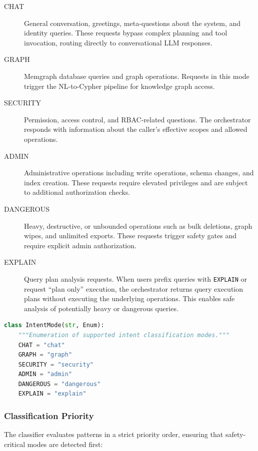 \begin{description}
    \item[CHAT] General conversation, greetings, meta-questions about the system, and identity queries. These requests bypass complex planning and tool invocation, routing directly to conversational LLM responses.
    
    \item[GRAPH] Memgraph database queries and graph operations. Requests in this mode trigger the NL-to-Cypher pipeline for knowledge graph access.
    
    \item[SECURITY] Permission, access control, and RBAC-related questions. The orchestrator responds with information about the caller's effective scopes and allowed operations.
    
    \item[ADMIN] Administrative operations including write operations, schema changes, and index creation. These requests require elevated privileges and are subject to additional authorization checks.
    
    \item[DANGEROUS] Heavy, destructive, or unbounded operations such as bulk deletions, graph wipes, and unlimited exports. These requests trigger safety gates and require explicit admin authorization.
    
    \item[EXPLAIN] Query plan analysis requests. When users prefix queries with \texttt{EXPLAIN} or request ``plan only'' execution, the orchestrator returns query execution plans without executing the underlying operations. This enables safe analysis of potentially heavy or dangerous queries.
\end{description}

\begin{lstlisting}[language=Python, caption={IntentMode enumeration}, label=lst:intent-mode-enum]
class IntentMode(str, Enum):
    """Enumeration of supported intent classification modes."""
    CHAT = "chat"
    GRAPH = "graph"
    SECURITY = "security"
    ADMIN = "admin"
    DANGEROUS = "dangerous"
    EXPLAIN = "explain"
\end{lstlisting}

\subsubsection{Classification Priority}

The classifier evaluates patterns in a strict priority order, ensuring that safety-critical modes are detected first:

